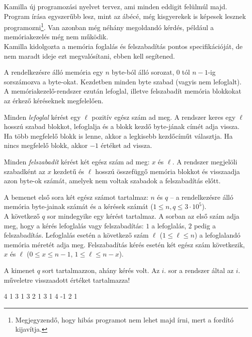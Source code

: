 




Kamilla új programozási nyelvet tervez, ami minden eddigit felülmúl majd. Program írása egyszerűbb lesz, mint az ábécé, még kisgyerekek is képesek lesznek programozni\footnote{Megjegyzendő, hogy hibás programot nem lehet majd írni, mert a fordító kijavítja.}. Van azonban még néhány megoldandó kérdés, például a memóriakezelés még nem működik. \\
Kamilla kidolgozta a memória foglalás és felszabadítás pontos specifikációját, de nem maradt ideje ezt megvalósítani, ebben kell segítened.

A rendelkezésre álló memória egy $n$ byte-ból álló sorozat,  $0$ tól $n-1$-ig sorszámozva a byte-okat. Kezdetben minden byte szabad (vagyis nem lefoglalt). A memóriakezelő-rendszer ezután lefoglal, illetve felszabadít memória blokkokat az érkező kéréseknek megfelelően.

Minden \emph{lefoglal} kérést egy $\ell$ pozitív egész szám ad meg. A rendszer keres egy $\ell$ hosszú szabad blokkot, lefoglalja és a blokk kezdő byte-jának címét adja vissza. Ha több megfelelő blokk is lenne, akkor a legkisebb kezdőcíműt választja. Ha nincs megfelelő blokk, akkor $-1$ értéket ad vissza.

Minden \emph{felszabadít} kérést két egész szám ad meg: $x$ és $\ell$. A rendszer megjelöli szabadként az $x$ kezdetű és $\ell$ hosszú összefüggő memória blokkot és visszaadja azon byte-ok számát, amelyek nem voltak szabadok a felszabadítás előtt.


A bemenet első sora két egész számot tartalmaz: $n$ és $q$ -- a rendelkezésre álló memória byte-jainak számát és a kérések számát  ($1 \leq n, q \leq
3\cdot 10^5$).\\
A következő $q$ sor mindegyike egy kérést tartalmaz. A sorban az első szám adja meg, hogy a kérés lefoglalás vagy felszabadítás: $1$ a lefoglalás, $2$ pedig a felszabadítás. Lefoglalás esetén a következő szám $\ell$ ($1 \leq \ell \leq n$) a lefoglalandó memória méretét adja meg. Felszabadítás kérés esetén két egész szám következik, $x$ és $\ell$ ($0 \leq x \leq n-1$, $1 \leq \ell \leq n-x$).



 A kimenet $q$ sort tartalmazzon, ahány kérés volt. Az $i$. sor a rendszer által az $i$.  műveletre visszaadott értéket tartalmazza!


 4
1 3
1 3
2 1 3
1 4
-1
2
1
\sampleEND



